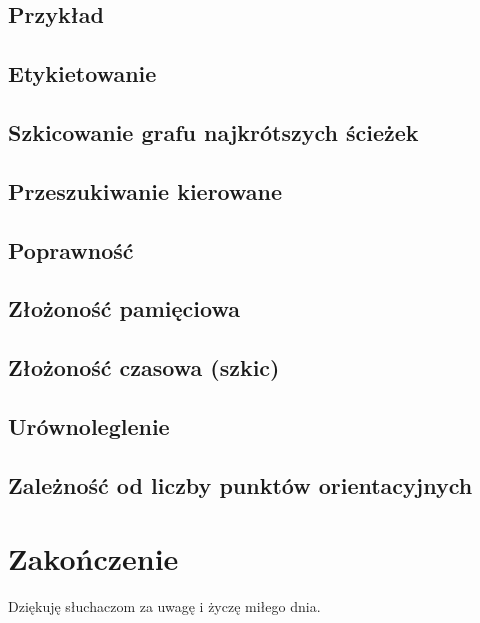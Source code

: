 \documentclass{article}
\theoremstyle{definition}
\begin{document}
    \subsection{Przykład}
     
    \subsection{Etykietowanie}

    \subsection{Szkicowanie grafu najkrótszych ścieżek}

    \subsection{Przeszukiwanie kierowane}
        
    \subsection{Poprawność}

    \subsection{Złożoność pamięciowa}
    
    \subsection{Złożoność czasowa (szkic)}

    \subsection{Urównoleglenie}
    

    \subsection{Zależność od liczby punktów orientacyjnych}
    
    \section{Zakończenie}
    Dziękuję słuchaczom za uwagę i życzę miłego dnia. 
    
\end{document}
